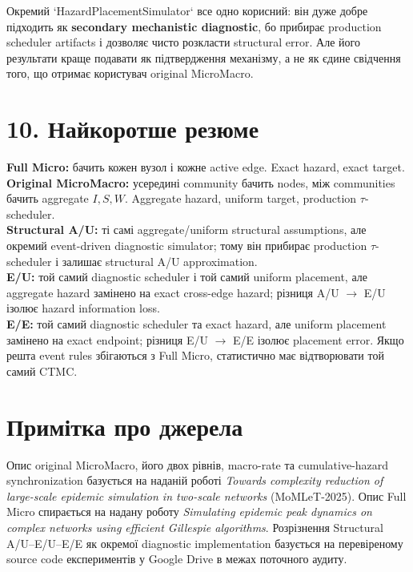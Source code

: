 \documentclass[11pt,a4paper]{article}
\begin{document}
Окремий `HazardPlacementSimulator` все одно корисний: він дуже добре підходить як \textbf{secondary mechanistic diagnostic}, бо прибирає production scheduler artifacts і дозволяє чисто розкласти structural error. Але його результати краще подавати як підтвердження механізму, а не як єдине свідчення того, що отримає користувач original MicroMacro.

\section*{10. Найкоротше резюме}

\begin{tcolorbox}[colback=soft,colframe=dark]
\textbf{Full Micro:} бачить кожен вузол і кожне active edge. Exact hazard, exact target.\\[3pt]
\textbf{Original MicroMacro:} усередині community бачить nodes, між communities бачить aggregate $I,S,W$. Aggregate hazard, uniform target, production $\tau$-scheduler.\\[3pt]
\textbf{Structural A/U:} ті самі aggregate/uniform structural assumptions, але окремий event-driven diagnostic simulator; тому він прибирає production $\tau$-scheduler і залишає structural A/U approximation.\\[3pt]
\textbf{E/U:} той самий diagnostic scheduler і той самий uniform placement, але aggregate hazard замінено на exact cross-edge hazard; різниця A/U $\to$ E/U ізолює hazard information loss.\\[3pt]
\textbf{E/E:} той самий diagnostic scheduler та exact hazard, але uniform placement замінено на exact endpoint; різниця E/U $\to$ E/E ізолює placement error. Якщо решта event rules збігаються з Full Micro, статистично має відтворювати той самий CTMC.
\end{tcolorbox}

\section*{Примітка про джерела}
Опис original MicroMacro, його двох рівнів, macro-rate та cumulative-hazard synchronization базується на наданій роботі \textit{Towards complexity reduction of large-scale epidemic simulation in two-scale networks} (MoMLeT-2025). Опис Full Micro спирається на надану роботу \textit{Simulating epidemic peak dynamics on complex networks using efficient Gillespie algorithms}. Розрізнення Structural A/U--E/U--E/E як окремої diagnostic implementation базується на перевіреному source code експериментів у Google Drive в межах поточного аудиту.
\end{document}
